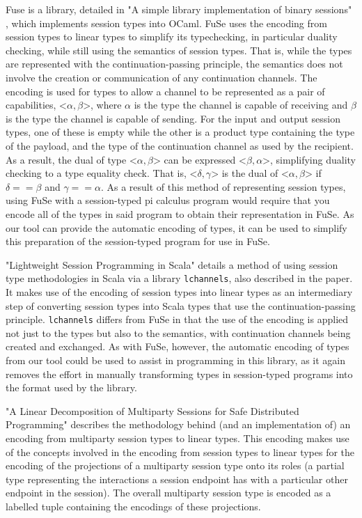 \documentclass{l4proj}
\begin{document}
\quad Fuse is a library, detailed in "A simple library implementation of binary sessions" \citep{padovani_2017}, which implements session types into OCaml. FuSe uses the encoding from session types to linear types to simplify its typechecking, in particular duality checking, while still using the semantics of session types. That is, while the types are represented with the continuation-passing principle, the semantics does not involve the creation or communication of any continuation channels. The encoding is used for types to allow a channel to be represented as a pair of capabilities, $\texttt{<}\alpha, \beta\texttt{>}$, where $\alpha$ is the type the channel is capable of receiving and $\beta$ is the type the channel is capable of sending. For the input and output session types, one of these is empty while the other is a product type containing the type of the payload, and the type of the continuation channel as used by the recipient. As a result, the dual of type $\texttt{<}\alpha, \beta\texttt{>}$ can be expressed $\texttt{<}\beta, \alpha\texttt{>}$, simplifying duality checking to a type equality check. That is, $\texttt{<}\delta, \gamma\texttt{>}$ is the dual of $\texttt{<}\alpha, \beta\texttt{>}$ if $\delta == \beta$ and $\gamma == \alpha$. As a result of this method of representing session types, using FuSe with a session-typed pi calculus program would require that you encode all of the types in said program to obtain their representation in FuSe. As our tool can provide the automatic encoding of types, it can be used to simplify this preparation of the session-typed program for use in FuSe.

\quad "Lightweight Session Programming in Scala" \citep{lchannels-scalas} details a method of using session type methodologies in Scala via a library \texttt{lchannels}, also described in the paper. It makes use of the encoding of session types into linear types as an intermediary step of converting session types into Scala types that use the continuation-passing principle. \texttt{lchannels} differs from FuSe in that the use of the encoding is applied not just to the types but also to the semantics, with continuation channels being created and exchanged. As with FuSe, however, the automatic encoding of types from our tool could be used to assist in programming in this library, as it again removes the effort in manually transforming types in session-typed programs into the format used by the library.

\quad "A Linear Decomposition of Multiparty Sessions for Safe Distributed Programming" \citep{scribble-scala} describes the methodology behind (and an implementation of) an encoding from multiparty session types to linear types. This encoding makes use of the concepts involved in the  encoding from session types to linear types for the encoding of the projections of a multiparty session type onto its roles (a partial type representing the interactions a session endpoint has with a particular other endpoint in the session). The overall multiparty session type is encoded as a labelled tuple containing the encodings of these projections.
\end{document}
